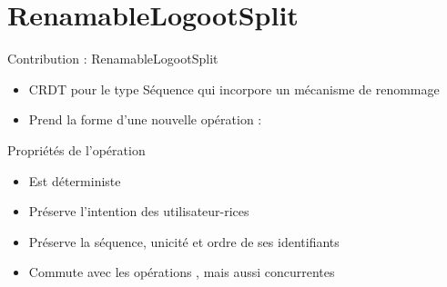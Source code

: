 \section{RenamableLogootSplit}

\begin{frame}{Contribution : RenamableLogootSplit}
    \begin{itemize}
        \item CRDT pour le type Séquence qui incorpore un mécanisme de renommage
        \item Prend la forme d'une nouvelle opération : \ren
    \end{itemize}
    \begin{block}{Propriétés de l'opération \ren}
        \begin{itemize}
            \item Est déterministe
            \item Préserve l'intention des utilisateur-rices
            \item Préserve la séquence, \ie unicité et ordre de ses identifiants
            \item Commute avec les opérations \ins, \rmv mais aussi \ren concurrentes
        \end{itemize}
    \end{block}
\end{frame}
